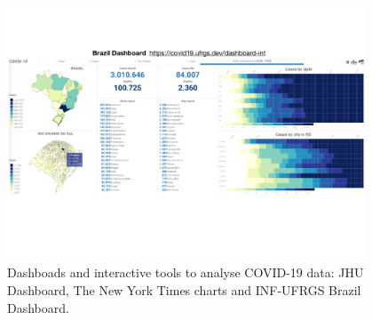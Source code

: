 \documentclass[10pt,journal,compsoc]{IEEEtran}
\begin{document}
\begin{figure}
	\includegraphics[width=0.95\textwidth]{figures/brazil-dashboard.pdf}
	\caption{Dashboads and interactive tools to analyse COVID-19 data: JHU Dashboard, The New York Times charts and INF-UFRGS Brazil Dashboard.}
	\label{fig:dashboards}
\end{figure}
\end{document}
